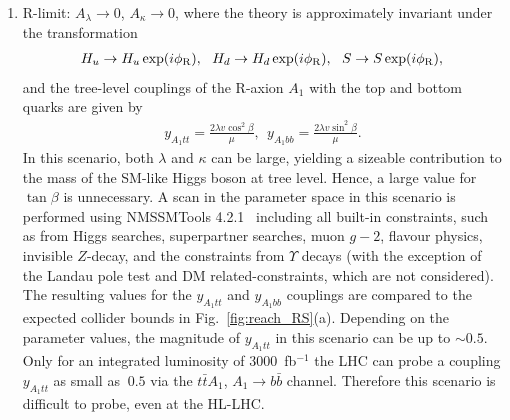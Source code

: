 \documentclass[preprintnumbers,superscriptaddress,nofootinbib,aps,prd,floatfix]{revtex4}
\begin{document}
\begin{enumerate}


\item R-limit: $A_\lambda \to 0$, $A_\kappa \to 0$, where the theory is approximately invariant under the transformation 
\begin{eqnarray}
H_u \to H_u \exp(i \phi_{\rm R}), \ \ H_d \to H_d \exp(i \phi_{\rm R}), \ \ S \to S \exp(i \phi_{\rm R}), 
\end{eqnarray}
and the tree-level couplings of the R-axion $A_1$ with the top and bottom quarks are given by  
\begin{eqnarray}
y_{A_1 tt} = \frac{2 \lambda v \cos^2 \beta}{\mu}, \ \  y_{A_1 bb} = \frac{2 \lambda v \sin^2 \beta}{\mu}.
\end{eqnarray}
In this scenario, both $\lambda$ and $\kappa$ can be large, yielding a sizeable contribution to the mass of the SM-like Higgs boson at tree level. Hence, a large value for $\tan\beta$ is unnecessary. A scan in the parameter space in this scenario is performed using NMSSMTools 4.2.1~\cite{NMSSMTools} including all built-in constraints, such as from Higgs searches, superpartner searches, muon $g-2$, flavour physics, invisible $Z$-decay, and the constraints from $\Upsilon$ decays (with the exception of the Landau pole test and DM related-constraints, which are not considered). 
The resulting values for the $y_{A_1tt}$ and $y_{A_1bb}$ couplings are compared to the expected collider bounds in Fig.~\ref{fig:reach_RS}(a).
Depending on the parameter values, the magnitude of $y_{A_1tt}$ in this scenario can be up to $\sim 0.5$. Only for an integrated luminosity of 3000~fb$^{-1}$ the LHC can probe a coupling $y_{A_1tt}$ as small as $~0.5$ via the $t\bar{t} A_1$, $A_1 \to b\bar{b}$ channel. Therefore this scenario is difficult to probe, even at the HL-LHC. 


\end{enumerate}
\end{document}
